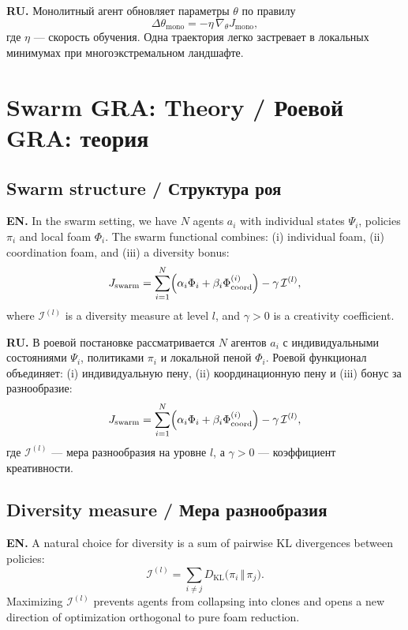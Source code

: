 \documentclass[11pt,a4paper]{article}
\begin{document}
\textbf{RU.}
Монолитный агент обновляет параметры $\theta$ по правилу
\begin{equation}
\Delta \theta_{\text{mono}} = -\eta \,\nabla_{\theta} J_{\text{mono}},
\end{equation}
где $\eta$ --- скорость обучения.
Одна траектория легко застревает в локальных минимумах при многоэкстремальном ландшафте.

\section{Swarm GRA: Theory / Роевой GRA: теория}

\subsection{Swarm structure / Структура роя}

\textbf{EN.}
In the swarm setting, we have $N$ agents $a_i$ with individual states $\Psi_i$, policies $\pi_i$ and local foam $\Phi_i$.
The swarm functional combines: (i) individual foam, (ii) coordination foam, and (iii) a diversity bonus:
\begin{equation}
J_{\text{swarm}} = \sum_{i=1}^{N} \Bigl(\alpha_i \Phi_i + \beta_i \Phi^{(i)}_{\text{coord}}\Bigr) - \gamma\,\mathcal{I}^{(l)},
\label{eq:Jswarm}
\end{equation}
where $\mathcal{I}^{(l)}$ is a diversity measure at level $l$, and $\gamma>0$ is a creativity coefficient.

\textbf{RU.}
В роевой постановке рассматривается $N$ агентов $a_i$ с индивидуальными состояниями $\Psi_i$, политиками $\pi_i$ и локальной пеной $\Phi_i$.
Роевой функционал объединяет: (i) индивидуальную пену, (ii) координационную пену и (iii) бонус за разнообразие:
\begin{equation}
J_{\text{swarm}} = \sum_{i=1}^{N} \Bigl(\alpha_i \Phi_i + \beta_i \Phi^{(i)}_{\text{coord}}\Bigr) - \gamma\,\mathcal{I}^{(l)},
\end{equation}
где $\mathcal{I}^{(l)}$ --- мера разнообразия на уровне $l$, а $\gamma>0$ --- коэффициент креативности.

\subsection{Diversity measure / Мера разнообразия}

\textbf{EN.}
A natural choice for diversity is a sum of pairwise KL divergences between policies:
\begin{equation}
\mathcal{I}^{(l)} = \sum_{i \neq j} D_{\text{KL}}\bigl(\pi_i \,\Vert\, \pi_j\bigr).
\label{eq:diversity}
\end{equation}
Maximizing $\mathcal{I}^{(l)}$ prevents agents from collapsing into clones and opens a new direction of optimization orthogonal to pure foam reduction.
\end{document}

